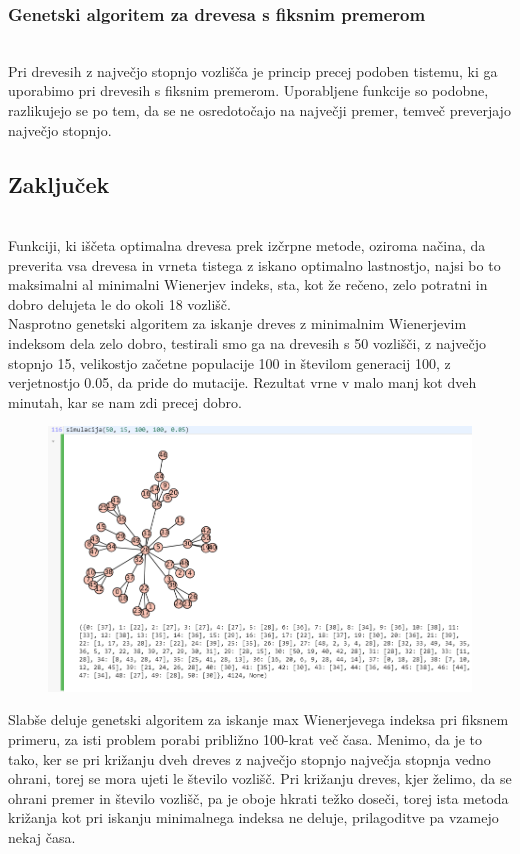 \documentclass[12pt,a4paper]{amsart}
\theoremstyle{definition} %
\theoremstyle{plain} %
\begin{document}
\subsubsection{Genetski algoritem za drevesa s fiksnim premerom}
\
\\
Pri drevesih z največjo stopnjo vozlišča je princip precej podoben tistemu, ki ga uporabimo pri drevesih s fiksnim premerom.
Uporabljene funkcije so podobne, razlikujejo se po tem, da se ne osredotočajo na največji premer, temveč preverjajo največjo stopnjo.


\subsection{Zaključek}
\
\\
Funkciji, ki iščeta optimalna drevesa prek izčrpne metode, oziroma načina, da preverita vsa drevesa in vrneta tistega
z iskano optimalno lastnostjo, najsi bo to maksimalni al minimalni Wienerjev indeks, sta, kot že rečeno, zelo potratni in dobro
delujeta le do okoli 18 vozlišč. 
\\
Nasprotno genetski algoritem za iskanje dreves z minimalnim Wienerjevim indeksom dela zelo dobro, testirali smo ga na drevesih s 50 vozlišči,
z največjo stopnjo 15, velikostjo začetne populacije 100 in številom generacij 100, z verjetnostjo 0.05, da pride do mutacije. Rezultat vrne v
malo manj kot dveh minutah, kar se nam zdi precej dobro.

\begin{figure}[ht]
\centering
\includegraphics[width=1\textwidth]{slika7}
\end{figure}

\pagebreak
Slabše deluje genetski algoritem za iskanje max Wienerjevega indeksa pri fiksnem primeru, za isti problem porabi približno 100-krat več časa.
Menimo, da je to tako, ker se pri križanju dveh dreves z največjo stopnjo največja stopnja vedno ohrani, torej se mora ujeti le število vozlišč.
Pri križanju dreves, kjer želimo, da se ohrani premer in število vozlišč, pa je oboje hkrati težko doseči, torej ista metoda križanja kot pri
iskanju minimalnega indeksa ne deluje, prilagoditve pa vzamejo nekaj časa.
\end{document}
